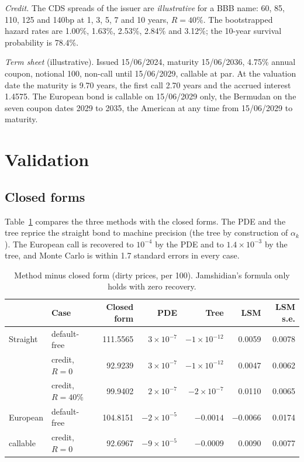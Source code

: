 \documentclass[11pt,a4paper]{article}
\begin{document}
\emph{Credit.} The CDS spreads of the issuer are \emph{illustrative} for a BBB name: 60, 85, 110, 125 and 140bp at
1, 3, 5, 7 and 10 years, $R = 40\%$. The bootstrapped hazard rates are 1.00\%, 1.63\%, 2.53\%, 2.84\% and 3.12\%; the
10-year survival probability is 78.4\%.

\emph{Term sheet} (illustrative). Issued 15/06/2024, maturity 15/06/2036, 4.75\% annual coupon, notional 100, non-call
until 15/06/2029, callable at par. At the valuation date the maturity is 9.70 years, the first call 2.70 years and the
accrued interest 1.4575. The European bond is callable on 15/06/2029 only, the Bermudan on the seven coupon dates
2029 to 2035, the American at any time from 15/06/2029 to maturity.

\section{Validation}\label{sec:validation}

\subsection{Closed forms}
Table~\ref{tab:closed} compares the three methods with the closed forms. The PDE and the tree reprice the straight
bond to machine precision (the tree by construction of $\alpha_k$). The European call is recovered to $10^{-4}$ by the
PDE and to $1.4\times10^{-3}$ by the tree, and Monte Carlo is within 1.7 standard errors in every case.

\begin{table}[h]
\centering
\begin{tabular}{@{}llrrrrr@{}}
\toprule
& \textbf{Case} & \textbf{Closed form} & \textbf{PDE} & \textbf{Tree} & \textbf{LSM} & \textbf{LSM s.e.} \\
\midrule
Straight & default-free & 111.5565 & $3\times10^{-7}$ & $-1\times10^{-12}$ & 0.0059 & 0.0078 \\
         & credit, $R = 0$ & 92.9239 & $3\times10^{-7}$ & $-1\times10^{-12}$ & 0.0047 & 0.0062 \\
         & credit, $R = 40\%$ & 99.9402 & $2\times10^{-7}$ & $-2\times10^{-7}$ & 0.0110 & 0.0065 \\
European & default-free & 104.8151 & $-2\times10^{-5}$ & $-0.0014$ & $-0.0066$ & 0.0174 \\
callable & credit, $R = 0$ & 92.6967 & $-9\times10^{-5}$ & $-0.0009$ & 0.0090 & 0.0077 \\
\bottomrule
\end{tabular}
\caption{Method minus closed form (dirty prices, per 100). Jamshidian's formula only holds with zero recovery.}
\label{tab:closed}
\end{table}
\end{document}
